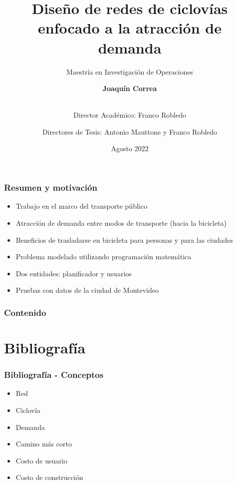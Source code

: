 \documentclass[aspectratio=43, 10pt]{beamer}
\title{Diseño de redes de ciclovías enfocado a la atracción de demanda}
\subtitle{Maestría en Investigación de Operaciones}
\author{
    \textbf{Joaquín Correa} \\\\
    \and
    Director Académico: Franco Robledo \\
    \and
    Directores de Tesis: Antonio Mauttone y Franco Robledo \\
}
\institute{Facultad de Ingeniería, Universidad de la República}
\date{Agosto 2022}
\begin{document}
\frame{
    \titlepage
}

\begin{frame}
    \frametitle{Resumen y motivación}

    \begin{itemize}
    \item{Trabajo en el marco del transporte público}
    \item{Atracción de demanda entre modos de transporte (hacia la bicicleta)}
    \item{Beneficios de trasladarse en bicicleta para personas y para las ciudades}
    \item{Problema modelado utilizando programación matemática}
    \item{Dos entidades: planificador y usuarios}
    \item{Pruebas con datos de la ciudad de Montevideo}
    \end{itemize}
\end{frame}

\begin{frame}
    \frametitle{Contenido}
    \tableofcontents
\end{frame}

\section{Bibliografía}

\begin{frame}
    \frametitle{Bibliografía - Conceptos}

    \begin{itemize}
    \item{Red}
    \item{Ciclovía}
    \item{Demanda}
    \item{Camino más corto}
    \item{Costo de usuario}
    \item{Costo de construcción}
    \end{itemize}
\end{frame}

\end{document}
